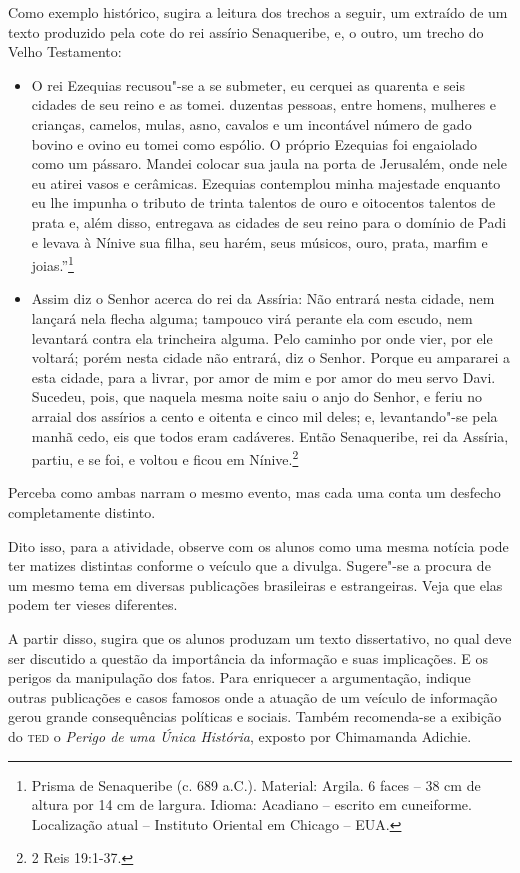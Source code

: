 \documentclass[12pt]{extarticle}
\begin{document}
Como exemplo histórico, sugira a leitura dos trechos a seguir, um
extraído de um texto produzido pela cote do rei assírio Senaqueribe, e,
o outro, um trecho do Velho Testamento:

\begin{itemize}
\item
O rei Ezequias recusou"-se a se submeter, eu cerquei as quarenta e seis
cidades de seu reino e as tomei. duzentas pessoas, entre homens,
mulheres e crianças, camelos, mulas, asno, cavalos e um incontável
número de gado bovino e ovino eu tomei como espólio. O próprio
Ezequias foi engaiolado como um pássaro. Mandei colocar sua jaula na
porta de Jerusalém, onde nele eu atirei vasos e cerâmicas. Ezequias
contemplou minha majestade enquanto eu lhe impunha o tributo de trinta
talentos de ouro e oitocentos talentos de prata e, além disso,
entregava as cidades de seu reino para o domínio de Padi e levava à
Nínive sua filha, seu harém, seus músicos, ouro, prata, marfim e
joias.''\footnote{Prisma de Senaqueribe (c. 689 a.C.). Material: Argila. 6 faces -- 38 cm de altura por 14 cm de largura. Idioma: Acadiano -- escrito em
cuneiforme. Localização atual -- Instituto Oriental em Chicago --
EUA.}

\item
  Assim diz o Senhor acerca do rei da Assíria: Não entrará nesta cidade,
  nem lançará nela flecha alguma; tampouco virá perante ela com escudo,
  nem levantará contra ela trincheira alguma. Pelo caminho por onde
  vier, por ele voltará; porém nesta cidade não entrará, diz o Senhor.
  Porque eu ampararei a esta cidade, para a livrar, por amor de mim e
  por amor do meu servo Davi. Sucedeu, pois, que naquela mesma noite
  saiu o anjo do Senhor, e feriu no arraial dos assírios a cento e
  oitenta e cinco mil deles; e, levantando"-se pela manhã cedo, eis que
  todos eram cadáveres. Então Senaqueribe, rei da Assíria, partiu, e se
  foi, e voltou e ficou em Nínive.\footnote{2 Reis 19:1-37.}
\end{itemize}

Perceba como ambas narram o mesmo evento, mas cada uma conta um desfecho
completamente distinto.

Dito isso, para a atividade, observe com os alunos como uma mesma
notícia pode ter matizes distintas conforme o veículo que a divulga.
Sugere"-se a procura de um mesmo tema em diversas publicações brasileiras
e estrangeiras. Veja que elas podem ter vieses diferentes.

A partir disso, sugira que os alunos produzam um texto dissertativo, no
qual deve ser discutido a questão da importância da informação e suas
implicações. E os perigos da manipulação dos fatos. Para enriquecer a
argumentação, indique outras publicações e casos famosos onde a atuação
de um veículo de informação gerou grande consequências políticas e
sociais. Também recomenda-se a exibição do \textsc{ted} o \emph{Perigo de uma
Única História}, exposto por Chimamanda Adichie.
\end{document}
